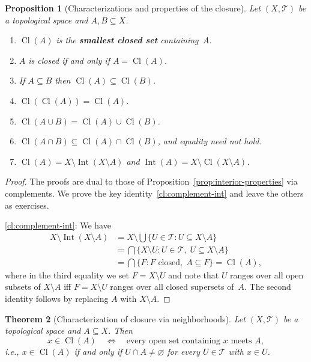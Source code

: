 \documentclass[11pt,a4paper,twoside]{book}
\newtheorem{theorem}{Theorem}[section]
\newtheorem{proposition}[theorem]{Proposition}
\theoremstyle{remark}
\theoremstyle{definition}
\theoremstyle{definition}
\newcommand{\Tau}{\mathcal{T}}           %
\DeclareMathOperator{\Int}{Int}
\DeclareMathOperator{\Cl}{Cl}
\begin{document}
\begin{proposition}[Characterizations and properties of the closure]
\label{prop:closure-properties}
Let $(X,\Tau)$ be a topological space and $A,B\subseteq X$.
\begin{enumerate}[label=\textup{(\roman*)}]
  \item\label{cl:smallest-closed}
        $\Cl(A)$ is the \textbf{smallest closed set} containing~$A$.
  \item\label{cl:closed-iff}
        $A$ is closed if and only if $A=\Cl(A)$.
  \item\label{cl:monotone}
        If $A\subseteq B$ then $\Cl(A)\subseteq\Cl(B)$.
  \item\label{cl:idempotent}
        $\Cl(\Cl(A))=\Cl(A)$.
  \item\label{cl:union}
        $\Cl(A\cup B)=\Cl(A)\cup\Cl(B)$.
  \item\label{cl:intersection}
        $\Cl(A\cap B)\subseteq\Cl(A)\cap\Cl(B)$, and equality need not hold.
  \item\label{cl:complement-int}
        $\Cl(A) = X\setminus\Int(X\setminus A)$ and
        $\Int(A) = X\setminus\Cl(X\setminus A)$.
\end{enumerate}
\end{proposition}

\begin{proof}
The proofs are dual to those of Proposition~\ref{prop:interior-properties}
via complements.  We prove the key identity~\ref{cl:complement-int} and
leave the others as exercises.

\ref{cl:complement-int}: We have
\begin{align*}
  X\setminus\Int(X\setminus A)
  &= X\setminus\bigcup\{U\in\Tau:U\subseteq X\setminus A\} \\
  &= \bigcap\{X\setminus U:U\in\Tau,\;U\subseteq X\setminus A\} \\
  &= \bigcap\{F:F\text{ closed},\; A\subseteq F\}
  = \Cl(A),
\end{align*}
where in the third equality we set $F=X\setminus U$ and note that $U$ ranges
over all open subsets of $X\setminus A$ iff $F=X\setminus U$ ranges over all
closed supersets of~$A$.  The second identity follows by replacing $A$ with
$X\setminus A$.
\end{proof}

\begin{theorem}[Characterization of closure via neighborhoods]
\label{thm:closure-nbhd}
Let $(X,\Tau)$ be a topological space and $A\subseteq X$.  Then
\[
  x\in\Cl(A)
  \quad\Longleftrightarrow\quad
  \text{every open set containing $x$ meets $A$},
\]
i.e., $x\in\Cl(A)$ if and only if $U\cap A\neq\varnothing$ for every
$U\in\Tau$ with $x\in U$.
\end{theorem}
\end{document}
